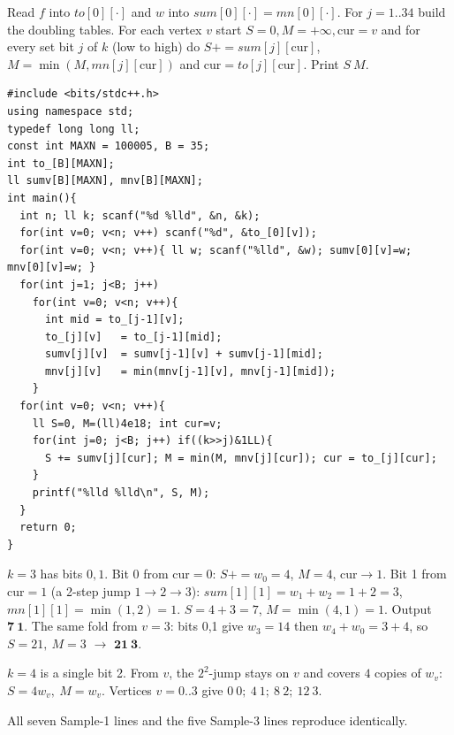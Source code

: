 Read \(f\) into \(\mathit{to}[0][\cdot]\) and \(w\) into \(\mathit{sum}[0][\cdot]=
\mathit{mn}[0][\cdot]\).  For \(j=1..34\) build the doubling tables.  For each vertex
\(v\) start \(S=0, M=+\infty, \text{cur}=v\) and for every set bit \(j\) of \(k\) (low to
high) do \(S{+}=\mathit{sum}[j][\text{cur}]\), \(M=\min(M,\mathit{mn}[j][\text{cur}])\)
and \(\text{cur}=\mathit{to}[j][\text{cur}]\).  Print \(S\ M\).

\begin{lstlisting}[caption={CF 702E. Binary lifting on the functional graph carrying a (sum, min) monoid; per vertex fold the set bits of k (up to 2 to the 34) low-to-high. Sums reach 1e18 so long long; min identity is a huge value}, label={lst:c31-funcpath}]
#include <bits/stdc++.h>
using namespace std;
typedef long long ll;
const int MAXN = 100005, B = 35;
int to_[B][MAXN];
ll sumv[B][MAXN], mnv[B][MAXN];
int main(){
  int n; ll k; scanf("%d %lld", &n, &k);
  for(int v=0; v<n; v++) scanf("%d", &to_[0][v]);
  for(int v=0; v<n; v++){ ll w; scanf("%lld", &w); sumv[0][v]=w; mnv[0][v]=w; }
  for(int j=1; j<B; j++)
    for(int v=0; v<n; v++){
      int mid = to_[j-1][v];
      to_[j][v]   = to_[j-1][mid];
      sumv[j][v]  = sumv[j-1][v] + sumv[j-1][mid];
      mnv[j][v]   = min(mnv[j-1][v], mnv[j-1][mid]);
    }
  for(int v=0; v<n; v++){
    ll S=0, M=(ll)4e18; int cur=v;
    for(int j=0; j<B; j++) if((k>>j)&1LL){
      S += sumv[j][cur]; M = min(M, mnv[j][cur]); cur = to_[j][cur];
    }
    printf("%lld %lld\n", S, M);
  }
  return 0;
}
\end{lstlisting}

\begin{tracebox}[Sample 3: \, 5-cycle \(f=(1,2,3,4,0)\), \(w=(4,1,2,14,3)\), \(k=3\), start \(v=0\)]
\(k=3\) has bits \(0,1\).  Bit 0 from cur\(=0\): \(S+=w_0=4\), \(M=4\), cur\(\to1\).  Bit 1
from cur\(=1\) (a 2-step jump \(1\to2\to3\)): \(\mathit{sum}[1][1]=w_1+w_2=1+2=3\),
\(\mathit{mn}[1][1]=\min(1,2)=1\).  \(S=4+3=7\), \(M=\min(4,1)=1\).  Output \(\mathbf{7\ 1}\).
The same fold from \(v=3\): bits 0,1 give \(w_3=14\) then \(w_4+w_0=3+4\), so
\(S=21,\ M=3\) \(\to\) \(\mathbf{21\ 3}\).
\end{tracebox}
\begin{tracebox}[Sample 2: \, all self-loops \(f=(0,1,2,3)\), \(w=(0,1,2,3)\), \(k=4\)]
\(k=4\) is a single bit 2.  From \(v\), the \(2^2\)-jump stays on \(v\) and covers
\(4\) copies of \(w_v\): \(S=4w_v,\ M=w_v\).  Vertices \(v=0..3\) give
\(0\ 0;\ 4\ 1;\ 8\ 2;\ 12\ 3\).
\end{tracebox}
All seven Sample-1 lines and the five Sample-3 lines reproduce identically.

